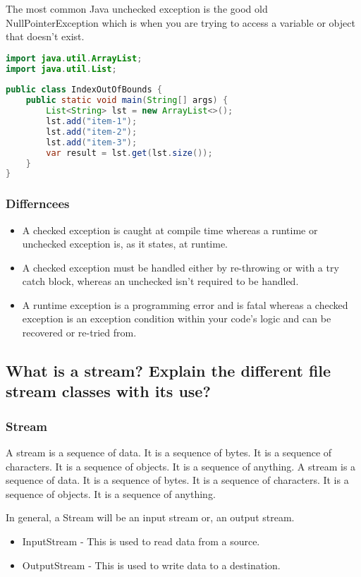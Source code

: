\documentclass[11pt]{article}
\begin{document}
The most common Java unchecked exception is the good old NullPointerException which is when you are trying to access a variable or object that doesn’t exist.\\


\begin{lstlisting}[language=Java]
import java.util.ArrayList; 
import java.util.List;
	
public class IndexOutOfBounds {
	public static void main(String[] args) { 
		List<String> lst = new ArrayList<>(); 
		lst.add("item-1");
		lst.add("item-2");
		lst.add("item-3");
		var result = lst.get(lst.size()); 
	}
}
\end{lstlisting}

\subsubsection{Differncees}
\begin{itemize}
	\item A checked exception is caught at compile time whereas a runtime or unchecked exception is, as it states, at runtime.
	\item A checked exception must be handled either by re-throwing or with a try catch block, whereas an unchecked isn’t required to be handled.
	\item A runtime exception is a programming error and is fatal whereas a checked exception is an exception condition within your code’s logic and can be recovered or re-tried from.
\end{itemize}

\subsection{\textbf{What is a stream? Explain the different file stream classes with its use?}}

\subsubsection{Stream}

A stream is a sequence of data. It is a sequence of bytes. It is a sequence of characters. It is a sequence of objects. It is a sequence of anything. A stream is a sequence of data. It is a sequence of bytes. It is a sequence of characters. It is a sequence of objects. It is a sequence of anything.

In general, a Stream will be an input stream or, an output stream.
\begin{itemize}
	\item InputStream - This is used to read data from a source.
	\item OutputStream - This is used to write data to a destination.
\end{itemize}
\end{document}
